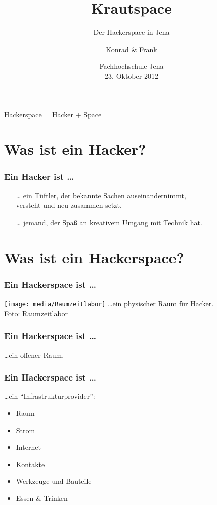\documentclass[english,compress,handout]{beamer}
\title{Krautspace}
\subtitle{Der Hackerspace in Jena}
\author[Schöbel]{Konrad \& Frank}
\institute[Hackspace Jena]{Hackspace Jena}
\date[23/10/2012]{Fachhochschule Jena \\ 23. Oktober 2012}
\begin{document}
\begin{center}

\begin{frame}
	\titlepage
\end{frame}

\begin{frame}
	\Large Hackerspace \quad = \quad Hacker \quad + \quad Space
\end{frame}

\section{Was ist ein Hacker?}

\begin{frame}
	\frametitle{Ein Hacker ist \ldots}
	\begin{itemize}
		\item[\ldots]
			ein Tüftler, der bekannte Sachen auseinandernimmt, \\
			versteht und neu zusammen setzt. \bigskip\\
		\item[\ldots] jemand, der Spaß an kreativem Umgang mit Technik hat.
	\end{itemize}
\end{frame}

\section{Was ist ein Hackerspace?}

\begin{frame}
	\frametitle{Ein Hackerspace ist \ldots}
	\vfill
	\texttt{[image: media/Raumzeitlabor]}
	\vfill
	\ldots ein physischer Raum für Hacker.\\
	\hfill
	\tiny{Foto: Raumzeitlabor}
\end{frame}

\begin{frame}
	\frametitle{Ein Hackerspace ist \ldots}
	\ldots ein offener Raum.
\end{frame}

\begin{frame}
	\frametitle{Ein Hackerspace ist \ldots}
	\ldots ein "`Infrastrukturprovider"':
	\vfill
	\begin{itemize}
		\item Raum
		\item Strom
		\item Internet
		\item Kontakte
		\item Werkzeuge und Bauteile
		\item Essen \& Trinken
	\end{itemize}
\end{frame}


\end{center}
\end{document}
